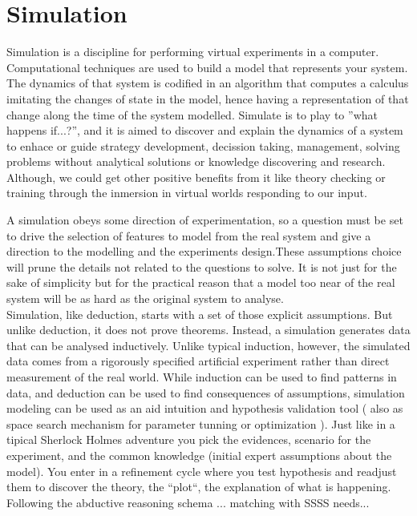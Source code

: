 \documentclass{report}
\begin{document}
	\section{Simulation}

Simulation is a discipline for performing virtual experiments in a computer. Computational techniques are used to build a model that represents your system. The dynamics of that system is codified in an algorithm that computes a calculus imitating the changes of state in the model, hence having a representation of that change along the time of the system modelled. Simulate is to play to ''what happens if...?'', and it is aimed to discover and explain the dynamics of a system to enhace or guide strategy development, decission taking, management, solving problems without analytical solutions or knowledge discovering and research. Although, we could get other positive benefits from it like theory checking or training through the inmersion in virtual worlds responding to our input.

A simulation obeys some direction of experimentation, so a question must be set to drive the selection of features to model from the real system and give a direction to the modelling and the experiments design.These assumptions choice will prune the details not related to the questions to solve. It is not just for the sake of simplicity but for the practical reason that a model too near of the real system will be as hard as the original system to analyse.\\
Simulation, like deduction, starts with a set of those explicit assumptions. But unlike deduction, it does not prove theorems. Instead, a simulation generates data that can be analysed inductively. Unlike typical induction, however, the simulated data comes from a rigorously specified artificial experiment rather than direct measurement of the real world. While induction can be used to find patterns in data, and deduction can be used to find consequences of assumptions, simulation modeling can be used as an aid intuition and hypothesis validation tool ( also as space search mechanism for parameter tunning or optimization ).
Just like in a tipical Sherlock Holmes adventure you pick the evidences, scenario for the experiment, and the common knowledge (initial expert assumptions about the model). You enter in a refinement cycle where you test hypothesis and readjust them to discover the theory, the ``plot``, the explanation of what is happening. Following the abductive reasoning schema ... matching with SSSS needs...
\end{document}
